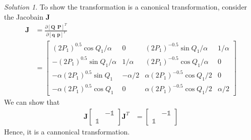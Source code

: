 \documentclass[twoside,11pt]{article}
\theoremstyle{definition}
\theoremstyle{remark}
\newtheorem*{solution}{Solution}
\begin{document}
\begin{solution} 
To show the transformation is a canonical transformation, consider the Jacobain $\mathbf{J}$
\begin{align*}
    \mathbf{J} &= \frac{\partial [\mathbf{Q} ~~ \mathbf{P}]^T}
    {\partial [\mathbf{q} ~~ \mathbf{p}]^T}\\
               &= \begin{bmatrix}
        (2P_1)^{0.5}\cos Q_1/\alpha & 0 & (2P_1)^{-0.5}\sin Q_1 /\alpha & 1/\alpha\\
        -(2P_1)^{0.5}\sin Q_1/\alpha & 1/\alpha & (2P_1)^{-0.5}\cos Q_1 /\alpha & 0 \\
        -\alpha(2P_1)^{0.5}\sin Q_1 & -\alpha/2 & \alpha (2P_1)^{-0.5}\cos Q_1/2 & 0\\
        -\alpha(2P_1)^{0.5}\cos Q_1 & 0 & \alpha (2P_1)^{-0.5}\cos Q_1/2 & \alpha/2
    \end{bmatrix}
\end{align*}
We can show that
\begin{align*}
    \mathbf{J}
    \begin{bmatrix}
        & -\mathbb{1} \\ \mathbb{1} & 
    \end{bmatrix}
    \mathbf{J}^T &= 
    \begin{bmatrix}
        & -\mathbb{1} \\ \mathbb{1} & 
    \end{bmatrix}
\end{align*}
Hence, it is a cannonical transformation.


\end{solution}
\end{document}
